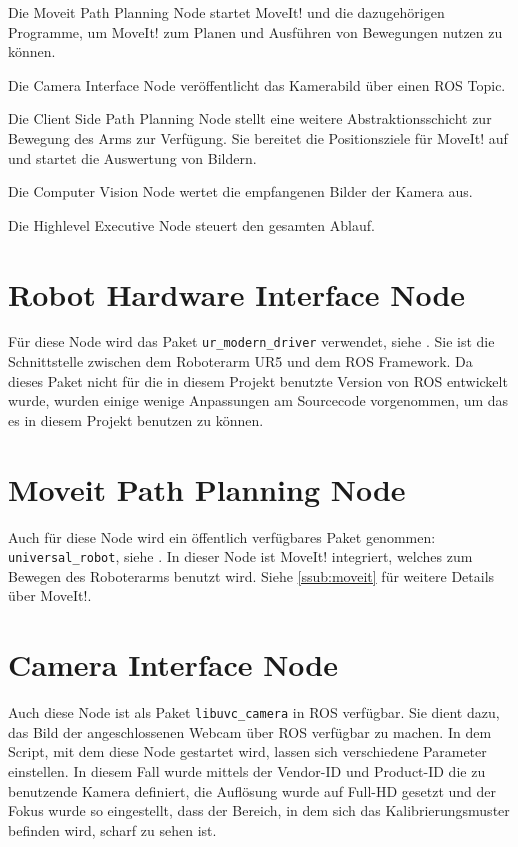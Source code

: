 Die Moveit Path Planning Node startet MoveIt! und die dazugehörigen Programme, um MoveIt! zum Planen und Ausführen von Bewegungen nutzen zu können.

Die Camera Interface Node veröffentlicht das Kamerabild über einen ROS Topic.

Die Client Side Path Planning Node stellt eine weitere Abstraktionsschicht zur Bewegung des Arms zur Verfügung. Sie bereitet die Positionsziele für MoveIt! auf und startet die Auswertung von Bildern.

Die Computer Vision Node wertet die empfangenen Bilder der Kamera aus.

Die Highlevel Executive Node steuert den gesamten Ablauf.

\section{Robot Hardware Interface Node} %
\label{sec:ur_modern_driver}
Für diese Node wird das Paket \texttt{ur\_modern\_driver} verwendet, siehe \cite{ur_modern_driver}. Sie ist die Schnittstelle zwischen dem Roboterarm UR5 und dem ROS Framework. Da dieses Paket nicht für die in diesem Projekt benutzte Version von ROS entwickelt wurde, wurden einige wenige Anpassungen am Sourcecode vorgenommen, um das es in diesem Projekt benutzen zu können.

\section{Moveit Path Planning Node} %
\label{sec:universal_robot}
Auch für diese Node wird ein öffentlich verfügbares Paket genommen: \texttt{universal\_robot}, siehe \cite{universal_robot}. In dieser Node ist MoveIt! integriert, welches zum Bewegen des Roboterarms benutzt wird. Siehe \autoref{ssub:moveit} für weitere Details über MoveIt!.

\section{Camera Interface Node} %
\label{sec:libuvc_camera}
Auch diese Node ist als Paket \texttt{libuvc\_camera} in ROS verfügbar. Sie dient dazu, das Bild der angeschlossenen Webcam über ROS verfügbar zu machen. In dem Script, mit dem diese Node gestartet wird, lassen sich verschiedene Parameter einstellen. In diesem Fall wurde mittels der Vendor-ID und Product-ID die zu benutzende Kamera definiert, die Auflösung wurde auf Full-HD gesetzt und der Fokus wurde so eingestellt, dass der Bereich, in dem sich das Kalibrierungsmuster befinden wird, scharf zu sehen ist.

